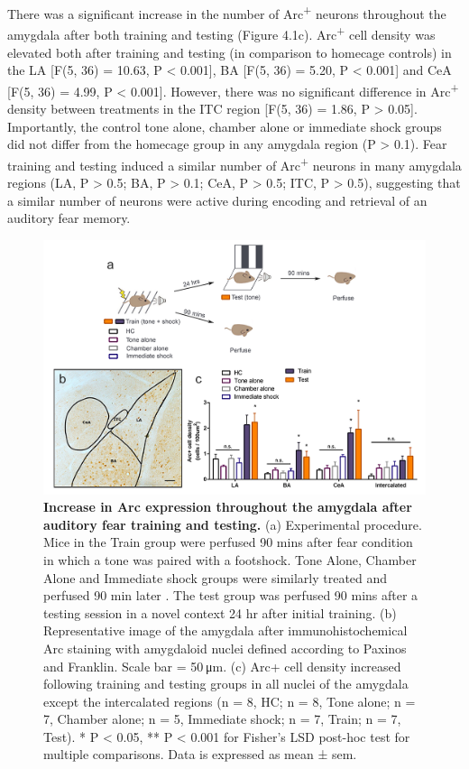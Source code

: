 \documentclass[12pt,a4paperpaper,]{report}
\begin{document}
There was a significant increase in the number of Arc\textsuperscript{+}
neurons throughout the amygdala after both training and testing (Figure
4.1c). Arc\textsuperscript{+} cell density was elevated both after
training and testing (in comparison to homecage controls) in the LA
{[}F(5, 36) = 10.63, P \textless{} 0.001{]}, BA {[}F(5, 36) = 5.20, P
\textless{} 0.001{]} and CeA {[}F(5, 36) = 4.99, P \textless{} 0.001{]}.
However, there was no significant difference in Arc\textsuperscript{+}
density between treatments in the ITC region {[}F(5, 36) = 1.86, P
\textgreater{} 0.05{]}. Importantly, the control tone alone, chamber
alone or immediate shock groups did not differ from the homecage group
in any amygdala region (P \textgreater{} 0.1). Fear training and testing
induced a similar number of Arc\textsuperscript{+} neurons in many
amygdala regions (LA, P \textgreater{} 0.5; BA, P \textgreater{} 0.1;
CeA, P \textgreater{} 0.5; ITC, P \textgreater{} 0.5), suggesting that a
similar number of neurons were active during encoding and retrieval of
an auditory fear memory.

\begin{figure}[htbp]
\centering
\includegraphics{source/figures/figure_1.jpg}
\caption{\textbf{Increase in Arc expression throughout the amygdala
after auditory fear training and testing.} (a) Experimental procedure.
Mice in the Train group were perfused 90 mins after fear condition in
which a tone was paired with a footshock. Tone Alone, Chamber Alone and
Immediate shock groups were similarly treated and perfused 90 min later
. The test group was perfused 90 mins after a testing session in a novel
context 24 hr after initial training. (b) Representative image of the
amygdala after immunohistochemical Arc staining with amygdaloid nuclei
defined according to Paxinos and Franklin. Scale bar = 50 μm. (c) Arc+
cell density increased following training and testing groups in all
nuclei of the amygdala except the intercalated regions (n = 8, HC; n =
8, Tone alone; n = 7, Chamber alone; n = 5, Immediate shock; n = 7,
Train; n = 7, Test). * P \textless{} 0.05, ** P \textless{} 0.001 for
Fisher's LSD post-hoc test for multiple comparisons. Data is expressed
as mean ± sem. \label{ref_a_figure}}
\end{figure}
\end{document}
